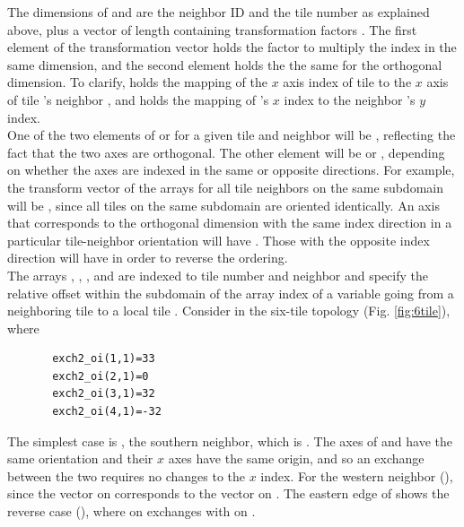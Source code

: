 The dimensions of  and 
are the neighbor ID  and the tile number  as explained
above, plus a vector of length  containing transformation
factors .  The first element of the transformation vector
holds the factor to multiply the index in the same dimension, and the
second element holds the the same for the orthogonal dimension.  To
clarify,  holds the mapping of the $x$ axis
index of tile  to the $x$ axis of tile 's neighbor
, and  holds the mapping of 's
$x$ index to the neighbor 's $y$ index. \\
 
One of the two elements of  or  for a
given tile  and neighbor  will be , reflecting
the fact that the two axes are orthogonal.  The other element will be
 or , depending on whether the axes are indexed in
the same or opposite directions.  For example, the transform vector of
the arrays for all tile neighbors on the same subdomain will be
, since all tiles on the same subdomain are oriented
identically.  An axis that corresponds to the orthogonal dimension
with the same index direction in a particular tile-neighbor
orientation will have .  Those with the opposite index
direction will have  in order to reverse the ordering. \\

The arrays ,
, , and
 are indexed to tile number and
neighbor and specify the relative offset within the subdomain of the
array index of a variable going from a neighboring tile  to a
local tile .  Consider  in the six-tile topology
(Fig. \ref{fig:6tile}), where

\begin{verbatim}
       exch2_oi(1,1)=33
       exch2_oi(2,1)=0
       exch2_oi(3,1)=32
       exch2_oi(4,1)=-32
\end{verbatim}

The simplest case is , the southern neighbor,
which is .  The axes of  and  have the
same orientation and their $x$ axes have the same origin, and so an
exchange between the two requires no changes to the $x$ index.  For
the western neighbor (),  since the
 vector on  corresponds to the  vector on
.  The eastern edge of  shows the reverse case
(), where  on  exchanges
with  on . \\

